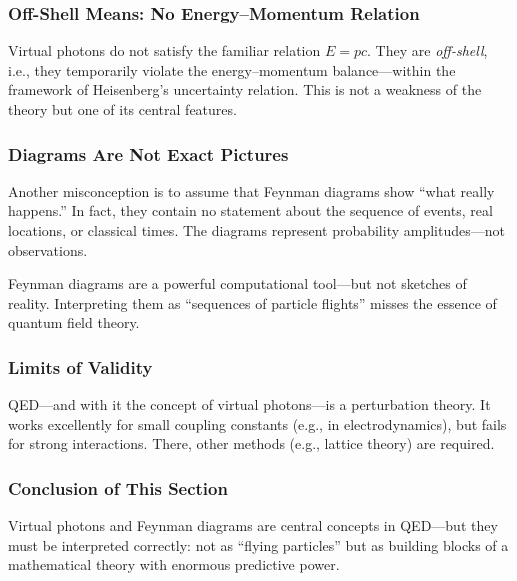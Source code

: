 \subsubsection*{Off-Shell Means: No Energy–Momentum Relation}
Virtual photons do not satisfy the familiar relation $E = pc$. They are \emph{off-shell}, i.e., they temporarily violate the energy–momentum balance—within the framework of Heisenberg’s uncertainty relation. This is not a weakness of the theory but one of its central features.

\subsubsection*{Diagrams Are Not Exact Pictures}
Another misconception is to assume that Feynman diagrams show “what really happens.” In fact, they contain no statement about the sequence of events, real locations, or classical times. The diagrams represent probability amplitudes—not observations.

\vspace{0.5em}
\begin{tcolorbox}[warnbox, title=Warning: Do Not Take Feynman Diagrams Literally!]
	\label{box:Warnung}
	Feynman diagrams are a powerful computational tool—but not sketches of reality. Interpreting them as “sequences of particle flights” misses the essence of quantum field theory.
\end{tcolorbox}

\subsubsection*{Limits of Validity}
QED—and with it the concept of virtual photons—is a perturbation theory. It works excellently for small coupling constants (e.g., in electrodynamics), but fails for strong interactions. There, other methods (e.g., lattice theory) are required.

\subsubsection*{Conclusion of This Section}
Virtual photons and Feynman diagrams are central concepts in QED—but they must be interpreted correctly: not as “flying particles” but as building blocks of a mathematical theory with enormous predictive power.

